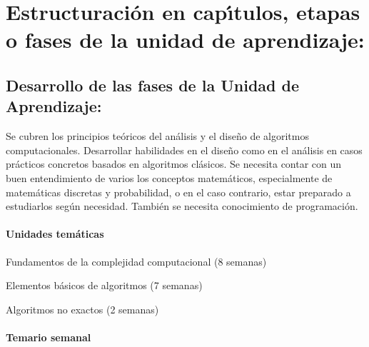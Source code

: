 \section{Estructuraci\'{o}n en cap\'{\i}tulos, etapas o fases de la unidad de
  aprendizaje:}


\subsection{Desarrollo de las fases de la Unidad de Aprendizaje:}

\quad

Se cubren los principios te\'{o}ricos del an\'{a}lisis y el dise\~{n}o
de algoritmos computacionales. Desarrollar habilidades en el
dise\~{n}o como en el an\'{a}lisis en casos pr\'{a}cticos concretos
basados en algoritmos cl\'{a}sicos. Se necesita contar con un buen
entendimiento de varios los conceptos matem\'{a}ticos, especialmente
de matem\'{a}ticas discretas y probabilidad, o en el caso contrario,
estar preparado a estudiarlos seg\'{u}n necesidad. Tambi\'{e}n se
necesita conocimiento de programaci\'{o}n.

\paragraph{Unidades tem\'{a}ticas}

\begin{description}[itemsep=-2pt]
\item[U1]{Fundamentos de la complejidad computacional (8 semanas)}
\item[U2]{Elementos b\'{a}sicos de algoritmos (7 semanas)}
\item[U3]{Algoritmos no exactos (2 semanas)}
\end{description}



\paragraph{Temario semanal}

\quad

